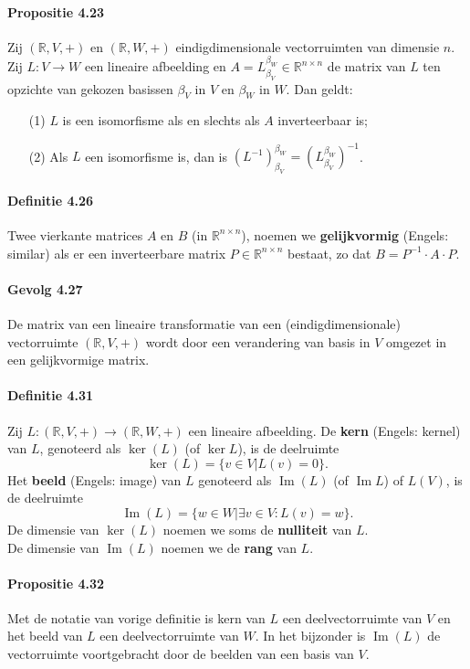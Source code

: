 \documentclass[11pt,oneside,a4paper]{article}
\DeclareMathOperator{\Ima}{Im}
\begin{document}
	\paragraph{Propositie 4.23}
			Zij $(\mathbb{R}, V, +)$ en $(\mathbb{R}, W, +)$ eindigdimensionale vectorruimten van dimensie $n$. Zij $L: V \to W$ een lineaire afbeelding en $A = L_{\beta_V}^{\beta_W} \in \mathbb{R}^{n\times n}$ de matrix van $L$ ten opzichte van gekozen basissen $\beta_V$ in $V$ en $\beta_W$ in $W$. Dan geldt: 
			\begin{itemize}
				\item[(1)] $L$ is een isomorfisme als en slechts als $A$ inverteerbaar is;
				\item[(2)] Als $L$ een isomorfisme is, dan is $(L^{-1})_{\beta_V}^{\beta_W} = (L_{\beta_V}^{\beta_W})^{-1}$.
			\end{itemize}
	\paragraph{Definitie 4.26}
		Twee vierkante matrices $A$ en $B$ (in $\mathbb{R}^{n\times n}$), noemen we \textbf{gelijkvormig} (Engels: similar) als er een inverteerbare matrix $P \in \mathbb{R}^{n\times n}$ bestaat, zo dat $B = P^{-1} \cdot A \cdot P$.
	\paragraph{Gevolg 4.27}
		De matrix van een lineaire transformatie van een (eindigdimensionale) vectorruimte $(\mathbb{R}, V,+)$ wordt door een verandering van basis in $V$ omgezet in een gelijkvormige matrix.
	\paragraph{Definitie 4.31}
		Zij $L: (\mathbb{R}, V, +) \to (\mathbb{R}, W, +)$ een lineaire afbeelding. De \textbf{kern} (Engels: kernel) van $L$, genoteerd als $\ker(L)$ (of $\ker L$), is de deelruimte
		$$\ker(L) = \{v\in V | L(v) = 0\}.$$ Het \textbf{beeld} (Engels: image) van $L$ genoteerd als $\Ima(L)$ (of $\Ima L$) of $L(V)$, is de deelruimte $$\Ima(L) = \{w\in W| \exists v \in V : L(v) = w\}.$$ 
		De dimensie van $\ker(L)$ noemen we soms de \textbf{nulliteit} van $L$. \\
		De dimensie van $\Ima(L)$ noemen we de \textbf{rang} van $L$. 
	\paragraph{Propositie 4.32}	
		Met de notatie van vorige definitie is kern van $L$ een deelvectorruimte van $V$ en het beeld van $L$ een deelvectorruimte van $W$. In het bijzonder is $\Ima(L)$ de vectorruimte voortgebracht door de beelden van een basis van $V$.
\end{document}
